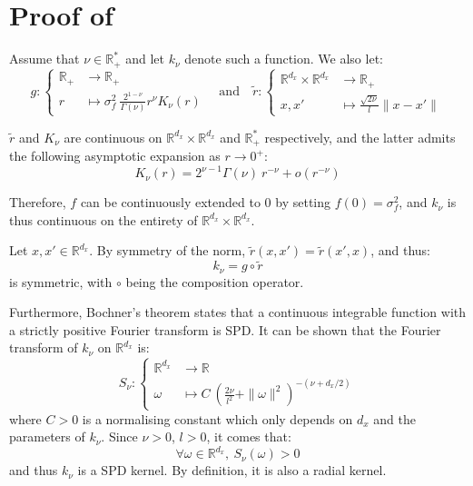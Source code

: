 \section[Proof of Proposition 3.3]{Proof of }\label{sec:proof_Matérn}

Assume that $\nu\in\mathbb{R}_+^*$ and let $k_\nu$ denote such a function. We also let:
\begin{equation}
	g:\left\{\begin{aligned}
	\mathbb{R}_+&\to\mathbb{R}_+\\
	r&\mapsto\sigma_f^2\:\frac{2^{1-\nu}}{\Gamma(\nu)}r^\nu K_\nu(r)
	\end{aligned}\right.
	\quad\text{and}\quad
	\tilde{r}:\left\{\begin{aligned}
	\mathbb{R}^{d_x}\times\mathbb{R}^{d_x}&\to\mathbb{R}_+\\
	x,x'&\mapsto\frac{\sqrt{2\nu}}{l}\|x-x'\|
	\end{aligned}\right.
\end{equation}

$\tilde{r}$ and $K_\nu$ are continuous on $\mathbb{R}^{d_x}\times\mathbb{R}^{d_x}$ and $\mathbb{R}_+^*$ respectively, and the latter admits the following asymptotic expansion as $r\to0^+$:
\begin{equation}
	K_\nu(r)=2^{\nu-1}\Gamma(\nu)\:r^{-\nu}+o\left(r^{-\nu}\right)
\end{equation}

Therefore, $f$ can be continuously extended to $0$ by setting $f(0)=\sigma_f^2$, and $k_\nu$ is thus continuous on the entirety of $\mathbb{R}^{d_x}\times\mathbb{R}^{d_x}$.

Let $x,x'\in\mathbb{R}^{d_x}$. By symmetry of the norm, $\tilde{r}(x,x')=\tilde{r}(x',x)$, and thus:
\begin{equation}
	k_\nu=g\circ\tilde{r}
\end{equation}
is symmetric, with $\circ$ being the composition operator.

Furthermore, Bochner's theorem \cite{bib:Akhiezer} states that a continuous integrable function with a strictly positive Fourier transform is SPD. It can be shown \cite{bib:Matérn-correlation} that the Fourier transform of $k_\nu$ on $\mathbb{R}^{d_x}$ is:
\begin{equation}
	S_\nu:\left\{\begin{aligned}
	\mathbb{R}^{d_x}&\to\mathbb{R}\\
	\omega&\mapsto C\:\left(\frac{2\nu}{l^2}+\|\omega\|^2\right)^{-(\nu+d_x/2)}
	\end{aligned}\right.
\end{equation}
where $C>0$ is a normalising constant which only depends on $d_x$ and the parameters of $k_\nu$. Since $\nu>0$, $l>0$, it comes that:
\begin{equation}
	\forall\omega\in\mathbb{R}^{d_x},\:S_\nu(\omega)>0
\end{equation}
and thus $k_\nu$ is a SPD kernel. By definition, it is also a radial kernel.

